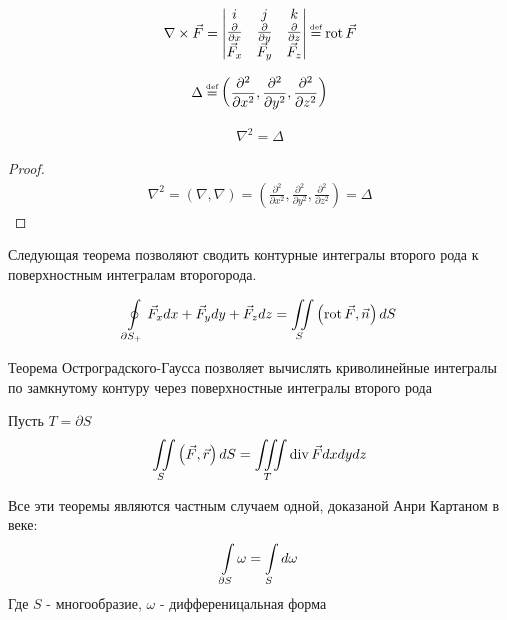 \begin{definition}
	\begin{gather*}
		\nabla \times \vec{F} = 
		\begin{vmatrix}
			i & j & k \\
			\pdiff{}{x} & \pdiff{}{y} & \pdiff{}{z} \\
			\vec{F}_x & \vec{F}_y & \vec{F}_z \notag
		\end{vmatrix}
		\defeq \rot \vec{F}
	\end{gather*}
\end{definition}

\begin{definition}
	\begin{gather*}
	\Delta \defeq 
		\left( \frac{\partial^2}{\partial x^2}, 
		       \frac{\partial^2}{\partial y^2}, 
			   \frac{\partial^2}{\partial z^2} \right)
	\end{gather*}
\end{definition}

\begin{theorem}[О треугольниках]
	\begin{gather*}
		\nabla^2 = \Delta
	\end{gather*}
\end{theorem}

\begin{proof}
	\begin{gather*}
		\nabla^2 = \left( \nabla , \nabla \right) = 
		\left( \frac{\partial^2}{\partial x^2}, 
		       \frac{\partial^2}{\partial y^2}, 
			   \frac{\partial^2}{\partial z^2} \right)
		= \Delta
	\end{gather*}
\end{proof}

Следующая теорема позволяют сводить контурные интегралы второго рода к 
поверхностным интегралам второгорода.

\begin{theorem}
	\begin{gather*}
		\oint\limits_{\partial S_{+}} \vec{F}_x dx + \vec{F}_y dy + \vec{F}_z dz =
		\iint\limits_{S} \left( \operatorname{rot} \vec{F}, \vec{n}\right)dS
	\end{gather*}
\end{theorem}
Теорема Остроградского-Гаусса позволяет вычислять криволинейные интегралы 
по замкнутому контуру через поверхностные интегралы второго рода
\begin{theorem}
	Пусть $T = \partial S$
	\begin{gather*}
		\iint\limits_{S} \left( \vec{F}, \vec{r}\right)dS = 
		\iiint\limits_{T} \operatorname{div} \vec{F} dxdydz
	\end{gather*}
\end{theorem}

\begin{nb}
	Все эти теоремы являются частным случаем одной, доказаной Анри Картаном в 
	 веке:
	\begin{gather*}
		\int\limits_{\partial S} \omega = \int\limits_{S} d\omega
	\end{gather*}
	Где $S$ - многообразие, $\omega$ - дифференицальная форма
\end{nb}
